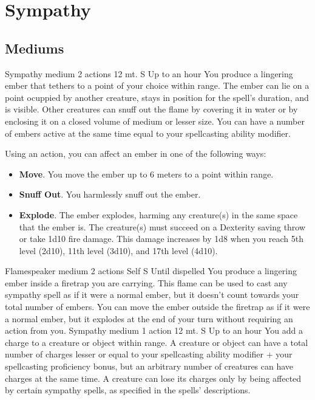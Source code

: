 \section{Sympathy}
\subsection*{Mediums}
        {Sympathy medium}
        {2 actions}
        {12 mt.}
        {S}
        {Up to an hour}
        You produce a lingering ember that tethers to a point of your choice within range.
        The ember can lie on a point ocuppied by another creature, stays in position for the spell's duration, and is visible.
        Other creatures can snuff out the flame by covering it in water or by enclosing it on a closed volume of medium or lesser size.
        You can have a number of embers active at the same time equal to your spellcasting ability modifier.

        Using an action, you can affect an ember in one of the following ways:
        \begin{itemize}
            \item \textbf{Move}.
            You move the ember up to 6 meters to a point within range.
            \item \textbf{Snuff Out}.
            You harmlessly snuff out the ember.
            \item \textbf{Explode}.
            The ember explodes, harming any creature(s) in the same space that the ember is.
            The creature(s) must succeed on a Dexterity saving throw or take 1d10 fire damage.
            This damage increases by 1d8 when you reach 5th level (2d10), 11th level (3d10), and 17th level (4d10).
        \end{itemize}
        {Flamespeaker medium}
        {2 actions}
        {Self}
        {S}
        {Until dispelled}
        You produce a lingering ember inside a firetrap you are carrying.
        This flame can be used to cast any sympathy spell as if it were a normal ember, but it doesn't count towards your total number of embers.
        You can move the ember outside the firetrap as if it were a normal ember, but it explodes at the end of your turn without requiring an action from you.
        {Sympathy medium}
        {1 action}
        {12 mt.}
        {S}
        {Up to an hour}
        You add a charge to a creature or object within range.
        A creature or object can have a total number of charges lesser or equal to your spellcasting ability modifier + your spellcasting proficiency bonus, but an arbitrary number of creatures can have charges at the same time.
        A creature can lose its charges only by being affected by certain sympathy spells, as specified in the spells' descriptions.

